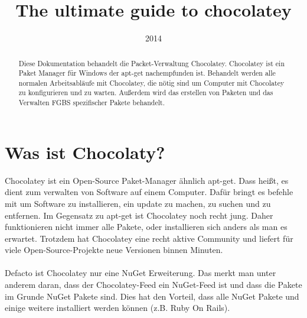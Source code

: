 \documentclass[10pt,a4paper]{article}
\title{The ultimate guide to chocolatey}
\date{2014}   %
\begin{document}
\maketitle


\begin{abstract}
Diese Dokumentation behandelt die Packet-Verwaltung Chocolatey. Chocolatey ist ein Paket Manager für Windows der apt-get nachempfunden ist. Behandelt werden alle normalen Arbeitsabläufe mit Chocolatey, die nötig sind um Computer mit Chocolatey zu konfigurieren und zu warten. Außerdem wird das erstellen von Paketen und das Verwalten FGBS spezifischer Pakete behandelt.
\end{abstract}

\tableofcontents




\section{Was ist Chocolaty?}
Chocolatey ist ein Open-Source Paket-Manager ähnlich apt-get. Dass heißt, es dient zum verwalten von Software auf einem Computer. Dafür bringt es befehle mit um Software zu installieren, ein update zu machen, zu suchen und zu entfernen. Im Gegensatz zu apt-get ist Chocolatey noch recht jung. Daher funktionieren nicht immer alle Pakete, oder installieren sich anders als man es erwartet. Trotzdem hat Chocolatey eine recht aktive Community und liefert für viele Open-Source-Projekte neue Versionen binnen Minuten.\\\\
Defacto ist Chocolatey nur eine NuGet Erweiterung. Das merkt man unter anderem daran, dass der Chocolatey-Feed ein NuGet-Feed ist und dass die Pakete im Grunde NuGet Pakete sind. Dies hat den Vorteil, dass alle NuGet Pakete und einige weitere installiert werden können (z.B. Ruby On Rails).
\end{document}
